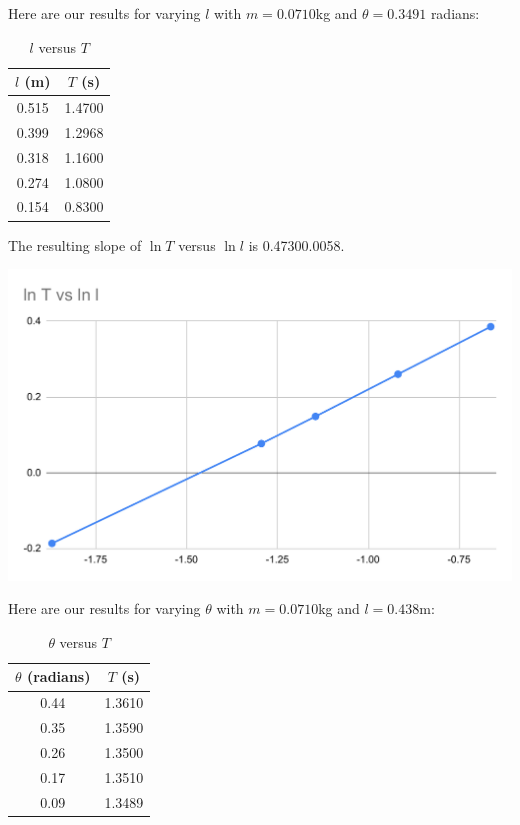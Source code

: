 \documentclass[12pt]{article}
\begin{document}
Here are our results for varying \(l\) with \(m = 0.0710\)kg and \(\theta = 0.3491\) radians:

\begin{table}[htbp]
\caption{\(l\) versus \(T\)}
\centering
\begin{tabular}{c|c}
\(l\) (m) & \(T\) (s)\\
\hline
0.515 & 1.4700\\
0.399 & 1.2968\\
0.318 & 1.1600\\
0.274 & 1.0800\\
0.154 & 0.8300\\
\end{tabular}
\end{table}

The resulting slope of \(\ln T\) versus \(\ln l\) is 0.4730\textpm{}0.0058.

\begin{center}
\includegraphics[width=6.5in]{./tvl.pdf}
\end{center}

Here are our results for varying \(\theta\) with \(m = 0.0710\)kg and \(l = 0.438\)m:

\begin{table}[htbp]
\caption{\(\theta\) versus \(T\)}
\centering
\begin{tabular}{c|c}
\(\theta\) (radians) & \(T\) (s)\\
\hline
0.44 & 1.3610\\
0.35 & 1.3590\\
0.26 & 1.3500\\
0.17 & 1.3510\\
0.09 & 1.3489\\
\end{tabular}
\end{table}
\end{document}
